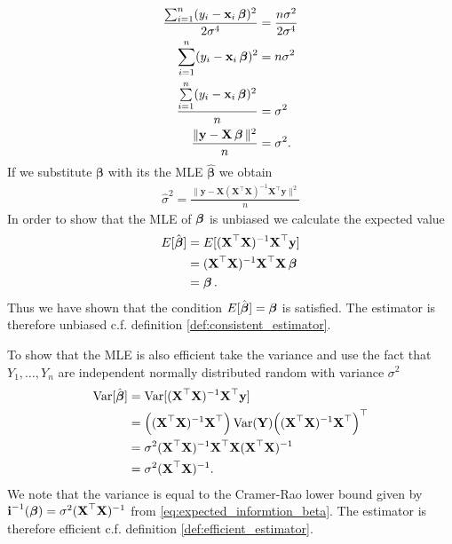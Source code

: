 \begin{example}
\begin{align*}
      \dfrac{\sum_{i=1}^n (y_i - \textbf{x}_i \operatorname{\boldsymbol{\beta}})^2}{2 \sigma^4} &= \dfrac{n\sigma^2}{2 \sigma^4} \\
      \sum_{i=1}^n (y_i - \textbf{x}_i \operatorname{\boldsymbol{\beta}})^2 &= n\sigma^2 \\
      \dfrac{\sum\limits_{i=1}^{n} (y_i - \textbf{x}_i \operatorname{\boldsymbol{\beta}})^2}{n} &= \sigma^2 \\
      \frac{\| \textbf{y} - \textbf{X}\operatorname{\boldsymbol{\beta}}\|^2}{n} &= \sigma^2.
\end{align*}
If we substitute $\boldsymbol{\beta}$ with its the MLE $\hat{\boldsymbol{\beta}}$ we obtain
\begin{align}\label{eq:MLE_for_sigma}
     \hat{\sigma}^2 = \frac{\| \textbf{y} - \textbf{X}(\textbf{X}^\top\textbf{X})^{-1}\textbf{X}^\top \textbf{y}\|^2}{n}
\end{align}
In order to show that the MLE of $\operatorname{\boldsymbol{\beta}}$ is unbiased we calculate the expected value
\begin{align*}
    E[\hat{\operatorname{\boldsymbol{\beta}}}]&=E[(\textbf{X}^\top\textbf{X})^{-1}\textbf{X}^\top \textbf{y}] \\
    &=(\textbf{X}^\top\textbf{X})^{-1}\textbf{X}^\top \textbf{X}\operatorname{\boldsymbol{\beta}} \\
    &= \operatorname{\boldsymbol{\beta}}.
\end{align*}
Thus we have shown that the condition $E[\hat{\operatorname{\boldsymbol{\beta}}}] = \operatorname{\boldsymbol{\beta}}$ is satisfied. The estimator is therefore unbiased c.f. definition \ref{def:consistent_estimator}.


To show that the MLE is also efficient take the variance and use the fact that $Y_1,\ldots,Y_n$ are independent normally distributed random with variance $\sigma^2$
\begin{align*}
\operatorname{\text{Var}}[\hat{\operatorname{\boldsymbol{\beta}}}]&=\operatorname{\text{Var}}[(\textbf{X}^\top\textbf{X})^{-1}\textbf{X}^\top \textbf{y}] \\
&=\Big((\textbf{X}^\top\textbf{X})^{-1}\textbf{X}^\top \Big) \operatorname{\text{Var}}(\textbf{Y}) \Big((\textbf{X}^\top\textbf{X})^{-1}\textbf{X}^\top\Big)^\top\\
&= \sigma^2 (\textbf{X}^\top\textbf{X})^{-1}\textbf{X}^\top\textbf{X}(\textbf{X}^\top\textbf{X})^{-1} \\
&= \sigma^2 (\textbf{X}^\top\textbf{X})^{-1}.
\end{align*}
We note that the variance is equal to the Cramer-Rao lower bound given by $\textbf{i}^{-1}(\operatorname{\boldsymbol{\beta}})=\sigma^2 (\textbf{X}^\top\textbf{X})^{-1}$ from \eqref{eq:expected_informtion_beta}. The estimator is therefore efficient c.f. definition \ref{def:efficient_estimator}.
\end{example}

